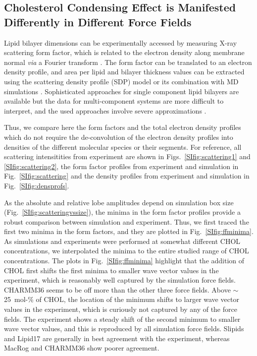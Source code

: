 \documentclass[journal=jctcce]{achemso}
\begin{document}
\subsection{Cholesterol Condensing Effect is Manifested Differently in Different Force Fields}

Lipid bilayer dimensions can be experimentally accessed by measuring X-ray scattering form factor, which is related to the electron density along membrane normal \textit{via} a Fourier transform \cite{pan12,Heftberger15,Marquardt15,ollila16,??}. The form factor can be translated to an electron density profile, and area per lipid and bilayer thickness values can be extracted using the scattering density profile (SDP) model or its combination with MD simulations  \cite{Kucerka08a,pan12,Heftberger15,Marquardt15,??,doktorova2020molecular}. Sophisticated approaches for single component lipid bilayers are available but the data for multi-component systems are more difficult to interpret, and the used approaches involve severe approximations \cite{pan12,Heftberger15,Marquardt15,??}. 

Thus, we compare here the form factors and the total electron density profiles which do not require the de-convolution of the electron density profiles into densities of the different molecular species or their segments. For reference, all scattering intensitities from experiment are shown in Figs.~\ref{SIfig:scattering1} and \ref{SIfig:scattering2}, the form factor profiles from experiment and simulation in Fig.~\ref{SIfig:scattering} and the density profiles from experiment and simulation in Fig.~\ref{SIfig:densprofs}.

As the absolute and relative lobe amplitudes depend on simulation box size (Fig.~\ref{SIfig:scatteringvssize}), the minima in the form factor profiles provide a robust comparison between simulation and experiment. Thus, we first traced the first two minima in the form factors, and they are plotted in Fig.~\ref{SIfig:ffminima}. As simulations and experiments were performed at somewhat different CHOL concentrations, we  interpolated the minima to the entire studied range of CHOL concentrations. The plots in Fig.~\ref{SIfig:ffminima} highlight that the addition of CHOL first shifts the first minima to smaller wave vector values in the experiment, which is reasonably well captured by the simulation force fields. CHARMM36 seems to be off more than the other three force fields. Above $\sim$25~mol-\% of CHOL, the location of the minimum shifts to larger wave vector values in the experiment, which is curiously not captured by any of the force fields. The experiment shows a steady shift of the second minimum to smaller wave vector values, and this is reproduced by all simulation force fields. Slipids and Lipid17 are generally in best agreement with the experiment, whereas MacRog and CHARMM36 show poorer agreement.
\end{document}
